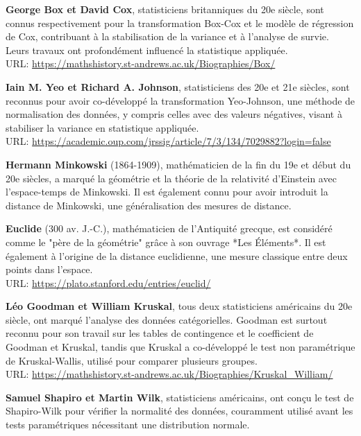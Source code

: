 \adjustmtc
\newpage
\renewcommand\bibname{Biographie}
\begin{thebibliography}{9}
\thispagestyle{MyStyle}

\textbf{George Box et David Cox}, statisticiens britanniques du 20e siècle, sont connus respectivement pour la transformation Box-Cox et le modèle de régression de Cox, contribuant à la stabilisation de la variance et à l'analyse de survie. Leurs travaux ont profondément influencé la statistique appliquée. \\ 
URL: \url{https://mathshistory.st-andrews.ac.uk/Biographies/Box/}

\textbf{Iain M. Yeo et Richard A. Johnson}, statisticiens des 20e et 21e siècles, sont reconnus pour avoir co-développé la transformation Yeo-Johnson, une méthode de normalisation des données, y compris celles avec des valeurs négatives, visant à stabiliser la variance en statistique appliquée.\\
URL: \url{https://academic.oup.com/jrssig/article/7/3/134/7029882?login=false}

\textbf{Hermann Minkowski} (1864-1909), mathématicien de la fin du 19e et début du 20e siècles, a marqué la géométrie et la théorie de la relativité d'Einstein avec l'espace-temps de Minkowski. Il est également connu pour avoir introduit la distance de Minkowski, une généralisation des mesures de distance.

\textbf{Euclide} (300 av. J.-C.), mathématicien de l'Antiquité grecque, est considéré comme le "père de la géométrie" grâce à son ouvrage *Les Éléments*. Il est également à l'origine de la distance euclidienne, une mesure classique entre deux points dans l'espace. \\ 
URL: \url{https://plato.stanford.edu/entries/euclid/}

\textbf{Léo Goodman et William Kruskal}, tous deux statisticiens américains du 20e siècle, ont marqué l'analyse des données catégorielles. Goodman est surtout reconnu pour son travail sur les tables de contingence et le coefficient de Goodman et Kruskal, tandis que Kruskal a co-développé le test non paramétrique de Kruskal-Wallis, utilisé pour comparer plusieurs groupes. \\ 
URL: \url{https://mathshistory.st-andrews.ac.uk/Biographies/Kruskal_William/}

\textbf{Samuel Shapiro et Martin Wilk}, statisticiens américains, ont conçu le test de Shapiro-Wilk pour vérifier la normalité des données, couramment utilisé avant les tests paramétriques nécessitant une distribution normale.


\end{thebibliography}
